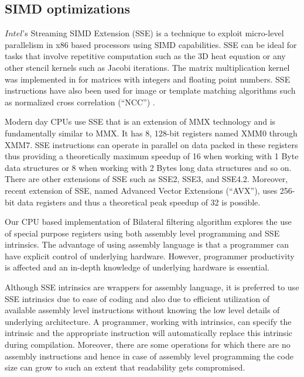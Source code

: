 \documentclass{IEEEtran}
\begin{document}
\subsection{SIMD optimizations}
\label{sub:SIMD1} 
$Intel$'s Streaming SIMD Extension (SSE) is a technique to exploit micro-level parallelism in x86 based processors using SIMD capabilities. SSE can be ideal for tasks that involve repetitive computation such as the 3D heat equation or any other stencil kernels such as Jacobi iterations\cite{kdatta2008}. The matrix multiplication kernel was implemented in \cite{matrix-multi,MatrixMultiFloating} for matrices with integers and floating point numbers. SSE instructions have also been used for image or template matching algorithms such as normalized cross correlation (``NCC'') \cite{NCCmatching}.

Modern day CPUs use SSE that is an extension of MMX technology and is fundamentally similar to MMX. It has 8, 128-bit registers named XMM0 through XMM7. SSE instructions can operate in parallel on data packed in these registers thus providing a theoretically maximum speedup of 16 when working with 1 Byte data structures or 8 when working with 2 Bytes long data structures and so on. There are other extensions of SSE such as SSE2, SSE3, and SSE4.2. Moreover, recent extension of SSE, named Advanced Vector Extensions (``AVX''), uses 256-bit data registers and thus a theoretical peak speedup of 32 is possible.

Our CPU based implementation of Bilateral filtering algorithm explores the use of special purpose registers using both assembly level programming and SSE intrinsics. The advantage of using assembly language is that a programmer can have explicit control of underlying hardware. However, programmer productivity is affected and an in-depth knowledge of underlying hardware is essential. 

Although SSE intrinsics are wrappers for assembly language, it is preferred to use SSE intrinsics due to ease of coding and also due to efficient utilization of available assembly level instructions without knowing the low level details of underlying architecture. A programmer, working with intrinsics, can specify the intrinsic and the appropriate instruction will automatically replace this intrinsic during compilation. Moreover, there are some operations for which there are no assembly instructions and hence in case of assembly level programming the code size can grow to such an extent that readability gets compromised.  
\end{document}
